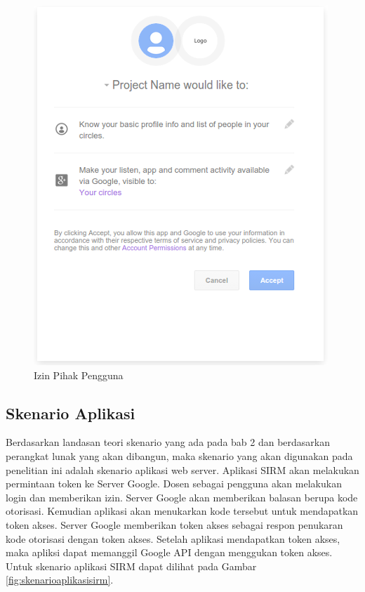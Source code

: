 \begin{figure}[H]
\centering
\includegraphics[scale=1]{Gambar/izinpengguna.png}
\caption[Izin Pihak Pengguna]{Izin Pihak Pengguna} 
\label{fig:izinpengguna}
\end{figure}

\subsection{Skenario Aplikasi}
Berdasarkan landasan teori skenario yang ada pada bab 2 dan berdasarkan perangkat lunak yang akan dibangun, maka skenario yang akan digunakan pada penelitian ini adalah skenario aplikasi web server. Aplikasi SIRM akan melakukan permintaan token ke Server Google. Dosen sebagai pengguna akan melakukan login dan memberikan izin. Server Google akan memberikan balasan berupa kode otorisasi. Kemudian aplikasi akan menukarkan kode tersebut untuk mendapatkan token akses. Server Google memberikan token akses sebagai respon penukaran kode otorisasi dengan token akses. Setelah aplikasi mendapatkan token akses, maka apliksi dapat memanggil Google API dengan menggukan token akses. Untuk skenario aplikasi SIRM dapat dilihat pada Gambar \ref{fig:skenarioaplikasisirm}.

